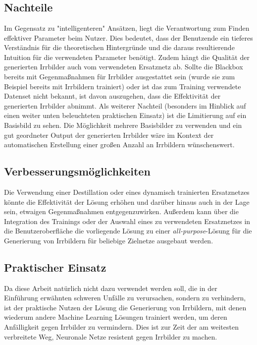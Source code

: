\chapter{}
\label{cha:conclusion}

\section{Nachteile}

Im Gegensatz zu "intelligenteren" Ansätzen, liegt die Verantwortung zum Finden effektiver Parameter beim Nutzer. Dies bedeutet, dass der Benutzende ein tieferes Verständnis für die theoretischen Hintergründe und die daraus resultierende Intuition für die verwendeten Parameter benötigt. 
Zudem hängt die Qualität der generierten Irrbilder auch vom verwendeten Ersatznetz ab. Sollte die Blackbox bereits mit Gegenmaßnahmen für Irrbilder ausgestattet sein (wurde sie zum Beispiel bereits mit Irrbildern trainiert) oder ist das zum Training verwendete Datenset nicht bekannt, ist davon auszugehen, dass die Effektivität der generierten Irrbilder abnimmt.
Als weiterer Nachteil (besonders im Hinblick auf einen weiter unten beleuchteten praktischen Einsatz) ist die Limitierung auf ein Basisbild zu sehen. Die Möglichkeit mehrere Basisbilder zu verwenden und ein gut geordneter Output der generierten Irrbilder wäre im Kontext der automatischen Erstellung einer großen Anzahl an Irrbildern wünschenswert. 

\section{Verbesserungsmöglichkeiten}

Die Verwendung einer Destillation oder eines dynamisch trainierten Ersatznetzes könnte die Effektivität der Lösung erhöhen und darüber hinaus auch in der Lage sein, etwaigen Gegenmaßnahmen entgegenzuwirken.
Außerdem kann über die Integration des Trainings oder der Auswahl eines zu verwendeten Ersatznetzes in die Benutzeroberfläche die vorliegende Lösung zu einer \textit{all-purpose}-Lösung für die Generierung von Irrbildern für beliebige Zielnetze ausgebaut werden.

\section{Praktischer Einsatz} 

Da diese Arbeit natürlich nicht dazu verwendet werden soll, die in der Einführung erwähnten schweren Unfälle zu verursachen, sondern zu verhindern, ist der praktische Nutzen der Lösung die Generierung von Irrbildern, mit denen wiederum andere Machine Learning Lösungen trainiert werden, um deren Anfälligkeit gegen Irrbilder zu vermindern. Dies ist zur Zeit der am weitesten verbreitete Weg, Neuronale Netze resistent gegen Irrbilder zu machen.  